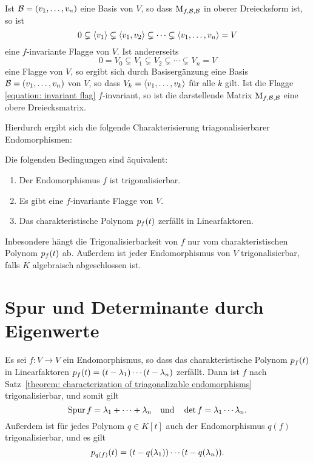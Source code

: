 Ist $\mathcal{B} = (v_1, \dotsc, v_n)$ eine Basis von $V$, so dass $\operatorname{M}_{f, \mathcal{B}, \mathcal{B}}$ in oberer Dreiecksform ist, so ist
\[
              0
  \subsetneq  \left\langle v_1 \right\rangle
  \subsetneq  \left\langle v_1, v_2 \right\rangle
  \subsetneq  \dotsb
  \subsetneq  \left\langle v_1, \dotsc, v_n \right\rangle
  =           V
\]
eine $f$-invariante Flagge von $V$.
Ist andererseits
\begin{equation}
  \label{equation: invariant flag}
              0
  =           V_0
  \subsetneq  V_1
  \subsetneq  V_2
  \subsetneq  \dotsb
  \subsetneq  V_n
  =           V
\end{equation}
eine Flagge von $V$, so ergibt sich durch Basisergänzung eine Basis $\mathcal{B} = (v_1, \dotsc, v_n)$ von $V$, so dass $V_k = \left\langle v_1, \dotsc, v_k \right\rangle$ für alle $k$ gilt.
Ist die Flagge \eqref{equation: invariant flag} $f$-invariant, so ist die darstellende Matrix $\operatorname{M}_{f, \mathcal{B}, \mathcal{B}}$ eine obere Dreiecksmatrix.

Hierdurch ergibt sich die folgende Charakterisierung triagonalisierbarer Endomorphismen:

\begin{theorem}
  \label{theorem: characterization of triagonalizable endomorphisms}
  Die folgenden Bedingungen sind äquivalent:
  \begin{enumerate}
    \item
      Der Endomorphismus $f$ ist trigonalisierbar.
    \item
      Es gibt eine $f$-invariante Flagge von $V$.
    \item
      Das charakteristische Polynom $p_{f}(t)$ zerfällt in Linearfaktoren.
  \end{enumerate}
\end{theorem}

Inbesondere hängt die Trigonalisierbarkeit von $f$ nur vom charakteristischen Polynom $p_{f}(t)$ ab.
Außerdem ist jeder Endomorphismus von $V$ trigonalisierbar, falls $K$ algebraisch abgeschlossen ist.



\section{Spur und Determinante durch Eigenwerte}
\label{section: trace and determinant via eigenvalues}

Es sei $f \colon V \to V$ ein Endomorphismus, so dass das charakteristische Polynom $p_{f}(t)$ in Linearfaktoren $p_{f}(t) = (t - \lambda_1) \dotsm (t - \lambda_n)$ zerfällt.
Dann ist $f$ nach Satz~\ref{theorem: characterization of triagonalizable endomorphisms} trigonalisierbar, und somit gilt
\[
    \operatorname{Spur} f
  = \lambda_1 + \dotsb + \lambda_n
\quad\text{und}\quad
    \det f
  = \lambda_1 \dotsm \lambda_n.
\]
Außerdem ist für jedes Polynom $q \in K[t]$ auch der Endomorphismus $q(f)$ trigonalisierbar, und es gilt
\[
    p_{q(f)}(t)
  = (t - q(\lambda_1)) \dotsm (t - q(\lambda_n)).
\]
